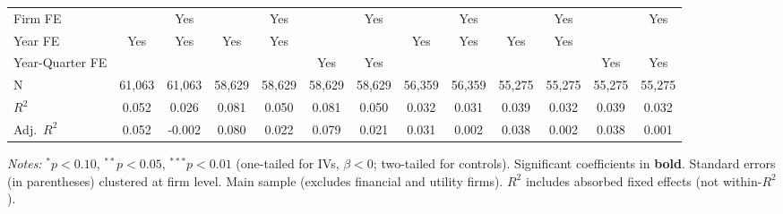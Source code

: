 \documentclass[11pt,a4paper]{article}
\begin{document}
\begin{table}[htbp]
\begin{tabular}{lcccccccccccc}
Firm FE &  & Yes &  & Yes &  & Yes &  & Yes &  & Yes &  & Yes \\
Year FE & Yes & Yes & Yes & Yes &  &  & Yes & Yes & Yes & Yes &  &  \\
Year-Quarter FE &  &  &  &  & Yes & Yes &  &  &  &  & Yes & Yes \\
\midrule
N & 61,063 & 61,063 & 58,629 & 58,629 & 58,629 & 58,629 & 56,359 & 56,359 & 55,275 & 55,275 & 55,275 & 55,275 \\
$R^2$ & 0.052 & 0.026 & 0.081 & 0.050 & 0.081 & 0.050 & 0.032 & 0.031 & 0.039 & 0.032 & 0.039 & 0.032 \\
Adj.~$R^2$ & 0.052 & -0.002 & 0.080 & 0.022 & 0.079 & 0.021 & 0.031 & 0.002 & 0.038 & 0.002 & 0.038 & 0.001 \\
\bottomrule
\end{tabular}
\begin{minipage}{\linewidth}
\vspace{2pt}\scriptsize
\textit{Notes:} $^{*}p<0.10$, $^{**}p<0.05$, $^{***}p<0.01$ (one-tailed for IVs, $\beta < 0$; two-tailed for controls).
 Significant coefficients in \textbf{bold}.
 Standard errors (in parentheses) clustered at firm level.
 Main sample (excludes financial and utility firms).
 $R^2$ includes absorbed fixed effects (not within-$R^2$).
\end{minipage}
\end{table}
\clearpage
\end{document}
